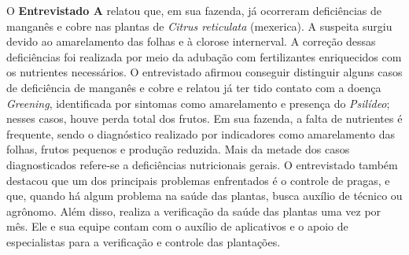 \medskip
O \textbf{Entrevistado A} relatou que, em sua fazenda, já ocorreram deficiências de manganês e 
cobre nas plantas de \textit{Citrus reticulata} (mexerica). A suspeita surgiu devido ao amarelamento das 
folhas e à clorose internerval. A correção dessas deficiências foi realizada por meio da adubação 
com fertilizantes enriquecidos com os nutrientes necessários. O entrevistado afirmou conseguir 
distinguir alguns casos de deficiência de manganês e cobre e relatou já ter tido contato com a 
doença \textit{Greening}, identificada por sintomas como amarelamento e presença do 
\textit{Psilídeo}; 
nesses casos, houve perda total dos frutos. Em sua fazenda, a falta de nutrientes é frequente, 
sendo o diagnóstico realizado por indicadores como amarelamento das folhas, frutos pequenos e 
produção reduzida. Mais da metade dos casos diagnosticados refere-se a deficiências nutricionais
gerais. O entrevistado também destacou que um dos principais problemas enfrentados é o controle 
de pragas, e que, quando há algum problema na saúde das plantas, busca auxílio de técnico ou 
agrônomo. Além disso, realiza a verificação da saúde das plantas uma vez por mês. Ele e sua 
equipe contam com o auxílio de aplicativos e o apoio de especialistas para a verificação e 
controle das plantações.


